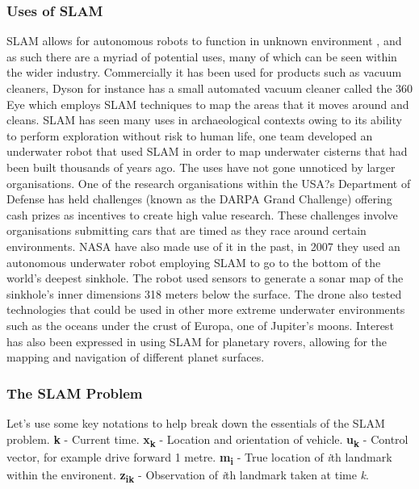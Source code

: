 				\subsubsection{Uses of SLAM}
				SLAM allows for autonomous robots to function in unknown environment \citep{durrant2006simultaneous, dissanayake2001solution}, and as such there are a myriad of potential uses, many of which can be seen within the wider industry. Commercially it has been used for products such as vacuum cleaners, Dyson for instance has a small automated vacuum cleaner called the 360 Eye which employs SLAM techniques to map the areas that it moves around and cleans. SLAM has seen many uses in archaeological contexts owing to its ability to perform exploration without risk to human life, one team \citep{clark2008archaeology} developed an underwater robot that used SLAM in order to map underwater cisterns that had been built thousands of years ago. The uses have not gone unnoticed by larger organisations. One of the research organisations within the USA?s Department of Defense has held challenges (known as the DARPA Grand Challenge) offering cash prizes as incentives to create high value research. These challenges involve organisations submitting cars that are timed as they race around certain environments. NASA have also made use of it in the past, in 2007 they used an autonomous underwater robot \citep{carnegie2007sinkhole} employing SLAM to go to the bottom of the world's deepest sinkhole. The robot used sensors to generate a sonar map of the sinkhole's inner dimensions 318 meters below the surface.  The drone also tested technologies that could be used in other more extreme underwater environments such as the oceans under the crust of Europa, one of Jupiter's moons. Interest has also been expressed in using SLAM for planetary rovers, allowing for the mapping and navigation of different planet surfaces.
				\medskip
			
				\subsubsection{The SLAM Problem}
				Let's use some key notations to help break down the essentials of the SLAM problem. \newline
				\textbf{k} - Current time. \newline
				\textbf{x\textsubscript{k}} - Location and orientation of vehicle. \newline
				\textbf{u\textsubscript{k}} - Control vector, for example drive forward 1 metre.  \newline
				\textbf{m\textsubscript{i}} - True location of \textit{i}th landmark within the environent. \newline
				\textbf{z\textsubscript{ik}} - Observation of \textit{i}th landmark taken at time \textit{k}.\newline
				

